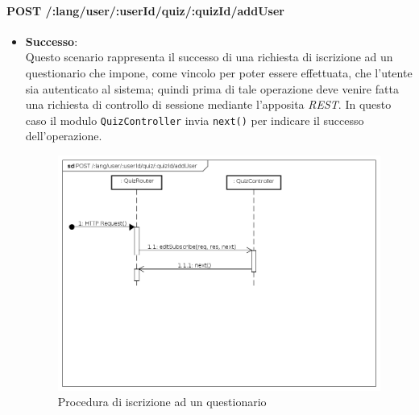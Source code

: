 \paragraph{POST /:lang/user/:userId/quiz/:quizId/addUser} %
\begin{itemize}
\item \textbf{Successo}:\\
Questo scenario rappresenta il successo di una richiesta di iscrizione ad un questionario che impone, come vincolo per poter essere effettuata, che l'utente sia autenticato al sistema; quindi prima di tale operazione deve venire fatta una richiesta di controllo di sessione mediante l'apposita \textit{REST}. In questo caso il modulo \texttt{QuizController} invia \texttt{next()} per indicare il successo dell'operazione.
\label{Procedura di iscrizione ad un questionario}
\begin{figure}[ht]
	\centering
	\includegraphics[scale=0.40]{UML/DiagrammiDiSequenza/Back-end/POST__lang_user_userId_quiz_quizId_addUser_success.png}
	\caption{Procedura di iscrizione ad un questionario}
\end{figure}
\FloatBarrier


\end{itemize}
